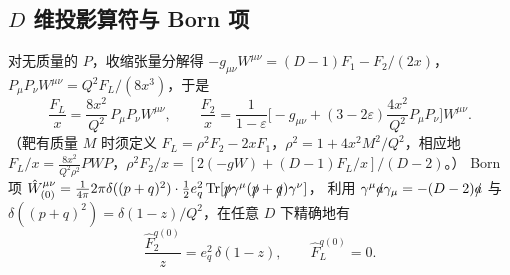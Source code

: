 \subsection{\texorpdfstring{$D$}{D} 维投影算符与 Born 项}

对无质量的 $P$，收缩张量分解得
$-g_{\mu\nu}W^{\mu\nu}=(D-1)F_1-F_2/(2x)$，$P_\mu P_\nu W^{\mu\nu}=Q^2F_L/(8x^3)$，于是
\begin{equation}\label{eq:dis1l-proj}
\frac{F_L}{x}=\frac{8x^2}{Q^2}\,P_\mu P_\nu W^{\mu\nu},\qquad
\frac{F_2}{x}=\frac{1}{1-\varepsilon}\Big[-g_{\mu\nu}+(3-2\varepsilon)\frac{4x^2}{Q^2}P_\mu P_\nu\Big]W^{\mu\nu}.
\end{equation}
（靶有质量 $M$ 时须定义 $F_L=\rho^2F_2-2xF_1$，$\rho^2=1+4x^2M^2/Q^2$，相应地
$F_L/x=\frac{8x^2}{Q^2\rho^2}PWP$，$\rho^2F_2/x=[2(-gW)+(D-1)F_L/x]/(D-2)$。）
Born 项 $\hat W^{\mu\nu}_{(0)}=\frac{1}{4\pi}2\pi\delta((p+q)^2)\cdot\frac12e_q^2\operatorname{Tr}[\slashed{p}\gamma^\mu(\slashed{p}+\slashed{q})\gamma^\nu]$，
利用 $\gamma^\mu\slashed{a}\gamma_\mu=-(D-2)\slashed{a}$ 与 $\delta((p+q)^2)=\delta(1-z)/Q^2$，在任意 $D$ 下精确地有
\begin{equation}\label{eq:dis1l-born}
\frac{\hat F_2^{q(0)}}{z}=e_q^2\,\delta(1-z),\qquad \hat F_L^{q(0)}=0 .
\end{equation}

